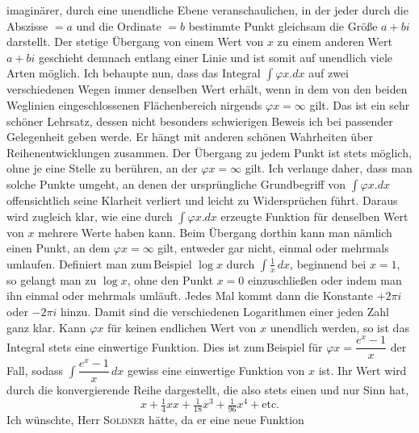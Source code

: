 %
imaginärer, durch eine unendliche Ebene veranschaulichen, in der jeder durch die Abszisse $=a$ und die Ordinate $=b$ bestimmte Punkt gleichsam die Größe $a+bi$ darstellt. Der stetige Übergang von einem Wert von $x$ zu einem anderen Wert $a+bi$ geschieht demnach entlang einer Linie und ist somit auf unendlich viele Arten möglich. Ich behaupte nun, dass das Integral $\int \varphi x\mathord{.} dx$ auf zwei verschiedenen Wegen immer denselben Wert erhält, wenn in dem von den beiden Weglinien eingeschlossenen Flächenbereich nirgends $\varphi x = \infty$ gilt. Das ist ein sehr schöner Lehrsatz, dessen nicht besonders schwierigen Beweis ich bei passender Gelegenheit geben werde. Er hängt mit anderen schönen Wahrheiten über Reihenentwicklungen zusammen. Der Übergang zu jedem Punkt ist stets möglich, ohne je eine Stelle zu berühren, an der $\varphi x=\infty$ gilt. Ich verlange daher, dass man solche Punkte umgeht, an denen der ursprüngliche Grundbegriff von $\int \varphi x\mathord{.} dx$ offensichtlich seine Klarheit verliert und leicht zu Widersprüchen führt. Daraus wird zugleich klar, wie eine durch $\int \varphi x\mathord{.} dx$ erzeugte Funktion für denselben Wert von $x$ mehrere Werte haben kann. Beim Übergang dorthin kann man nämlich einen Punkt, an dem $\varphi x=\infty$ gilt, entweder gar nicht, einmal oder mehrmals umlaufen. Definiert man zum\,Beispiel $\log x$ durch $\int \frac{1}{x}\,dx$, beginnend bei $x=1$, so gelangt man zu $\log x$, ohne den Punkt $x=0$ einzuschließen oder indem man ihn einmal oder mehrmals umläuft. Jedes Mal kommt dann die Konstante $+2\pi i$ oder $-2\pi i$ hinzu. Damit sind die verschiedenen Logarithmen einer jeden Zahl ganz klar. Kann $\varphi x$ für keinen endlichen Wert von $x$ unendlich werden, so ist das Integral stets eine einwertige Funktion. Dies ist zum\,Beispiel für $\varphi x = \dfrac{e^x-1}{x}$ der Fall, sodass $\int \dfrac{e^x-1}{x}\,dx$ gewiss eine einwertige Funktion von $x$ ist. Ihr Wert wird durch die  konvergierende Reihe dargestellt, die also stets einen und nur  Sinn hat,
\[
x+\tfrac{1}{4}xx+\tfrac{1}{18}x^3+\tfrac{1}{96}x^4+\text{etc.}
\]
\noindent Ich wünschte, Herr \textsc{Soldner} hätte, da er eine neue Funktion%
